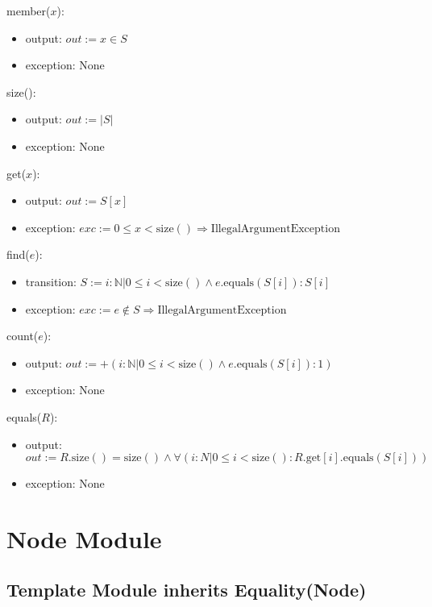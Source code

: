 \documentclass[12pt]{article}
\begin{document}
\noindent member($x$):
\begin{itemize}
	\item output: $out := x \in S$
	\item exception: None
\end{itemize}

\noindent size():
\begin{itemize}
	\item output: $out := |S|$
	\item exception: None
\end{itemize}

\noindent get($x$):
\begin{itemize}
	\item output: $out := \textit{S}[x]$
	\item exception: $exc := 0 \le x < \mbox{size}() \Rightarrow \text{IllegalArgumentException}$
\end{itemize}

\noindent find($e$):
\begin{itemize}
	\item transition: $S := i : \mathbb{N} | 0 \le i < \mbox{size}() \land e.\mbox{equals}(\textit{S}[i]) : \textit{S}[i]$
	\item exception: $exc := e \notin S \Rightarrow \text{IllegalArgumentException}$
\end{itemize}

\noindent count($e$):
\begin{itemize}
	\item output: $out := +(i : \mathbb{N} | 0 \le i < \mbox{size}() \land e.\mbox{equals}(\textit{S}[i]) : 1)$
	\item exception: None
\end{itemize}

\noindent equals($R$):
\begin{itemize}
	\item output: $out := R.\mbox{size}() = \mbox{size}() \land \forall (i: N | 0 \le i < \mbox{size}() : R.\mbox{get}[i].\mbox{equals}(\textit{S}[i]))$
	\item exception: None
\end{itemize}

\newpage

\section{Node Module}

\subsection*{Template Module inherits Equality(Node)}
\end{document}
